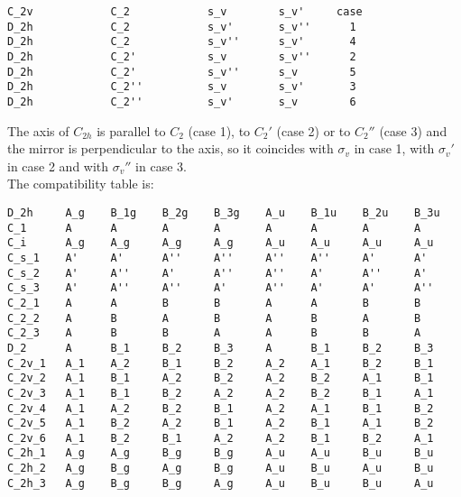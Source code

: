 \documentclass[12pt,a4paper,twoside]{report}
\begin{document}
\begin{tcolorbox}
\begin{footnotesize}
\begin{verbatim}
C_2v            C_2            s_v        s_v'     case
D_2h            C_2            s_v'       s_v''      1
D_2h            C_2            s_v''      s_v'       4
D_2h            C_2'           s_v        s_v''      2 
D_2h            C_2'           s_v''      s_v        5
D_2h            C_2''          s_v        s_v'       3
D_2h            C_2''          s_v'       s_v        6
\end{verbatim}
\end{footnotesize}
\end{tcolorbox}

The axis of $C_{2h}$ is parallel to $C_2$ (case 1),
to $C_2'$ (case 2) or to $C_2''$ (case 3) and the mirror is perpendicular
to the axis, so it coincides with $\sigma_v$ in case 1, with $\sigma_v'$ in
case 2 and with $\sigma_v''$ in case 3. \\
The compatibility table is:

\begin{tcolorbox}
\begin{footnotesize}
\begin{verbatim}
D_2h     A_g    B_1g    B_2g    B_3g    A_u    B_1u    B_2u    B_3u     
C_1      A      A       A       A       A      A       A       A
C_i      A_g    A_g     A_g     A_g     A_u    A_u     A_u     A_u 
C_s_1    A'     A'      A''     A''     A''    A''     A'      A'   
C_s_2    A'     A''     A'      A''     A''    A'      A''     A'   
C_s_3    A'     A''     A''     A'      A''    A'      A'      A''   
C_2_1    A      A       B       B       A      A       B       B
C_2_2    A      B       A       B       A      B       A       B
C_2_3    A      B       B       A       A      B       B       A 
D_2      A      B_1     B_2     B_3     A      B_1     B_2     B_3
C_2v_1   A_1    A_2     B_1     B_2     A_2    A_1     B_2     B_1   
C_2v_2   A_1    B_1     A_2     B_2     A_2    B_2     A_1     B_1   
C_2v_3   A_1    B_1     B_2     A_2     A_2    B_2     B_1     A_1   
C_2v_4   A_1    A_2     B_2     B_1     A_2    A_1     B_1     B_2
C_2v_5   A_1    B_2     A_2     B_1     A_2    B_1     A_1     B_2
C_2v_6   A_1    B_2     B_1     A_2     A_2    B_1     B_2     A_1
C_2h_1   A_g    A_g     B_g     B_g     A_u    A_u     B_u     B_u   
C_2h_2   A_g    B_g     A_g     B_g     A_u    B_u     A_u     B_u   
C_2h_3   A_g    B_g     B_g     A_g     A_u    B_u     B_u     A_u   
\end{verbatim}
\end{footnotesize}
\end{tcolorbox}
\end{document}
